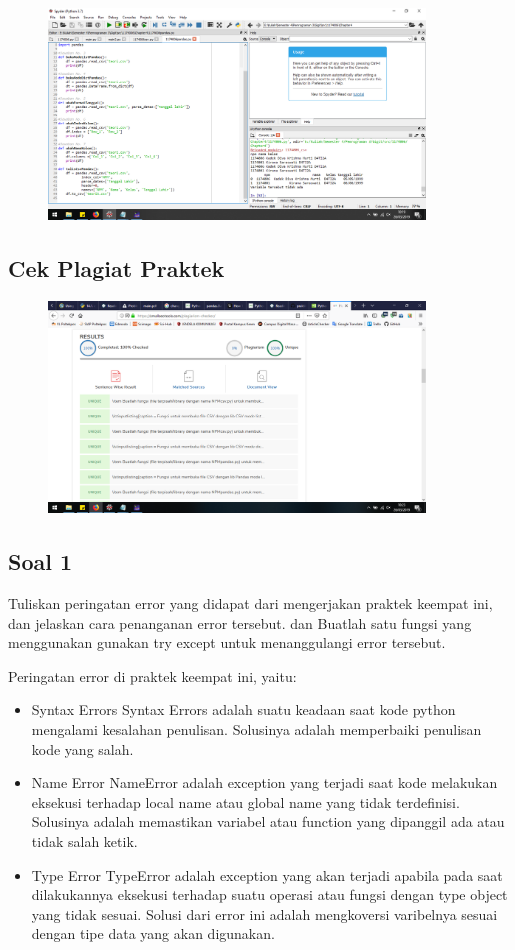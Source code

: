 \begin{figure}[H]
	\includegraphics[width=10cm]{figures/4/1174006/Praktek/k5.png}
	\centering
\end{figure}

\subsection{Cek Plagiat Praktek}
\begin{figure}[H]
	\includegraphics[width=10cm]{figures/4/1174006/Praktek/plagiatketrampilan.png}
	\centering
\end{figure}

\subsection{Soal 1}
Tuliskan  peringatan  error  yang  didapat  dari  mengerjakan  praktek  keempat  ini, dan  jelaskan  cara  penanganan  error  tersebut.   dan  Buatlah  satu  fungsi  yang menggunakan gunakan try except untuk menanggulangi error tersebut.

Peringatan error di praktek keempat ini, yaitu:
\begin{itemize}
	\item Syntax Errors
	Syntax Errors adalah suatu keadaan saat kode python mengalami kesalahan penulisan. Solusinya adalah memperbaiki penulisan kode yang salah.
	
	\item Name Error
	NameError adalah exception yang terjadi saat kode melakukan eksekusi terhadap local name atau global name yang tidak terdefinisi. Solusinya adalah memastikan variabel atau function yang dipanggil ada atau tidak salah ketik.
	
	\item Type Error
	TypeError adalah exception yang akan terjadi apabila pada saat dilakukannya eksekusi terhadap suatu operasi atau fungsi dengan type object yang tidak sesuai. Solusi dari error ini adalah mengkoversi varibelnya sesuai dengan tipe data yang akan digunakan.
\end{itemize}

